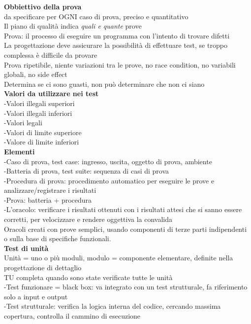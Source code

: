 \documentclass{article}
\begin{document}
				\textbf{Obbiettivo della prova}\\
				da specificare per OGNI caso di prova, preciso e quantitativo\\
				Il piano di qualità indica \textit{quali e quante} prove\\
				Prova: il processo di eseguire un programma con l'intento di trovare difetti\\
				La progettazione deve assicurare la possibilità di effettuare test, se troppo complessa è difficile da provare\\
				Prova ripetibile, niente variazioni tra le prove, no race condition, no variabili globali, no side effect\\
				Determina se ci sono guasti, non può determinare che non ci siano\\
				
				\textbf{Valori da utilizzare nei test}\\
				-Valori illegali superiori\\
				-Valori illegali inferiori\\
				-Valori legali\\
				-Valori di limite superiore\\
				-Valore di limite inferiori\\
				
				\textbf{Elementi}\\
				-Caso di prova, test case: ingresso, uscita, oggetto di prova, ambiente\\
				-Batteria di prova, test suite: sequenza di casi di prova\\
				-Procedura di prova: procedimento automatico per eseguire le prove e analizzare/registrare i risultati\\
				-Prova: batteria + procedura\\
				-L'oracolo: verificare i risultati ottenuti con i risultati attesi che si sanno essere corretti, per velocizzare e rendere oggettiva la convalida\\
				Oracoli creati con prove semplici, usando componenti di terze parti indipendenti o sulla base di specifiche funzionali.\\
				
				\textbf{Test di unità}\\
				Unità = uno o più moduli, modulo = componente elementare, definite nella progettazione di dettaglio\\
				TU completa quando sono state verificate tutte le unità\\
				-Test funzionare = black box: va integrato con un test strutturale, fa riferimento solo a input e output\\
				-Test strutturale: verifica la logica interna del codice, cercando massima copertura, controlla il cammino di esecuzione\\
				
\end{document}

